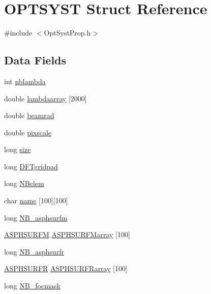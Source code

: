 \hypertarget{structOPTSYST}{\section{O\+P\+T\+S\+Y\+S\+T Struct Reference}
\label{structOPTSYST}
}


{\ttfamily \#include $<$Opt\+Syst\+Prop.\+h$>$}

\subsection*{Data Fields}
\begin{DoxyCompactItemize}
\item 
int \hyperlink{structOPTSYST_a984f1bc6e335c6ca935a7a4abc960351}{nblambda}
\item 
double \hyperlink{structOPTSYST_affffe3221582de4166398a84debc5257}{lambdaarray} \mbox{[}2000\mbox{]}
\item 
double \hyperlink{structOPTSYST_a10d097a25c01cbe9263690707182f0c8}{beamrad}
\item 
double \hyperlink{structOPTSYST_aa64373d953735e7fc898f664706ae434}{pixscale}
\item 
long \hyperlink{structOPTSYST_a1ca7a42369dc6bf1567dbeb3028c8a2a}{size}
\item 
long \hyperlink{structOPTSYST_ad30b68bcbf477c2e7348e9452a8d1693}{D\+F\+Tgridpad}
\item 
long \hyperlink{structOPTSYST_ab9532e90f1fa8a506d6316eac6dfd5ce}{N\+Belem}
\item 
char \hyperlink{structOPTSYST_a34aa88e64500d7284c204080a5bad111}{name} \mbox{[}100\mbox{]}\mbox{[}100\mbox{]}
\item 
long \hyperlink{structOPTSYST_a42bf1a88cf3bc234c3ff551f7094be9e}{N\+B\+\_\+asphsurfm}
\item 
\hyperlink{structASPHSURFM}{A\+S\+P\+H\+S\+U\+R\+F\+M} \hyperlink{structOPTSYST_ab559d2b56f4502be6cc1ea69f5b55f7d}{A\+S\+P\+H\+S\+U\+R\+F\+Marray} \mbox{[}100\mbox{]}
\item 
long \hyperlink{structOPTSYST_a1d1453dfab2f1a7d2cbd8c1a0f6b0174}{N\+B\+\_\+asphsurfr}
\item 
\hyperlink{structASPHSURFR}{A\+S\+P\+H\+S\+U\+R\+F\+R} \hyperlink{structOPTSYST_aa6ed8c7ac4cc2c0aa47af3b4a585e774}{A\+S\+P\+H\+S\+U\+R\+F\+Rarray} \mbox{[}100\mbox{]}
\item 
long \hyperlink{structOPTSYST_a70fa5cf6b8805eecaa3c31e982273c02}{N\+B\+\_\+focmask}
\item 

\end{DoxyCompactItemize}

